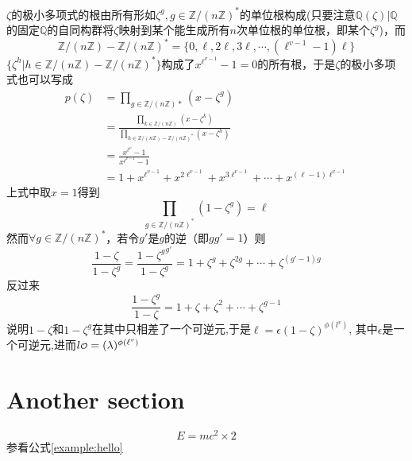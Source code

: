 \documentclass[a4paper, 10pt]{book}
\newcommand {\Q}{\mathbb{Q}}
\newcommand {\Z}{\mathbb{Z}}
\newcommand {\idealo}{\text{\scriptsize{$\mathcal{O}$}}}
\begin{document}
$\zeta$的极小多项式的根由所有形如$\zeta^g, g \in \Z / (n\Z)^*$的单位根构成(只要注意$\Q(\zeta)|\Q$的固定$\Q$的自同构群将$\zeta$映射到某个能生成所有$n$次单位根的单位根，即某个$\zeta^g$)，而
$$
\Z / (n\Z) - \Z / (n\Z)^* = \{0, \ell, 2\ell, 3\ell, \cdots,  (\ell^{v-1} - 1)\ell\}
$$
$\{\zeta^h|h \in \Z / (n\Z) - \Z / (n\Z)^*\}$构成了$x^{\ell^{v-1}} -1 = 0$的所有根，于是$\zeta$的极小多项式也可以写成
$$
\begin{aligned}
    p(\zeta) 
        &= \prod_{g\in \Z/(n\Z)*}(x - \zeta^g) \\
        &= \frac{\prod_{k\in\Z/(n\Z)} (x-\zeta^k)}{\prod_{h\in \Z/(n\Z) - \Z / (n\Z)^*}{(x-\zeta^h)}} \\
        &= \frac{x^{\ell^v} - 1}{x^{\ell^{v-1}}-1} \\
        &= 1 + x^{\ell^{v-1}} + x^{2\ell^{v-1}} + x^{3\ell^{v-1}} + \cdots + x^{(\ell-1)\ell^{v-1}}
\end{aligned}
$$
上式中取$x=1$得到
$$
\prod_{g\in \Z/(n\Z)^*}(1-\zeta^g)=\ell
$$
然而$\forall g \in \Z / (n\Z)^*$，若令$g'$是$g$的逆（即$gg'=1$）则
$$
\frac{1-\zeta}{1-\zeta^g} = \frac{1-{\zeta^{g}}^{g'}}{1-\zeta^g} = 1+\zeta^g + \zeta^{2g}+ \cdots +\zeta^{(g'-1)g}
$$
反过来
$$
\frac{1-\zeta^g}{1-\zeta} = 1+\zeta + \zeta^2+ \cdots+\zeta^{g-1}
$$
说明$1-\zeta$和$1-\zeta^g$在其中只相差了一个可逆元,于是$\ell = \epsilon(1-\zeta)^{\phi(l^v)}$, 其中$\epsilon$是一个可逆元,进而$l\idealo = (\lambda)^{\phi(\ell^v)}$

\section{Another section}
\begin{equation}
    \label{example:hello}
    E = m c^2 \times 2
\end{equation}
参看公式\ref{example:hello}
\end{document}
